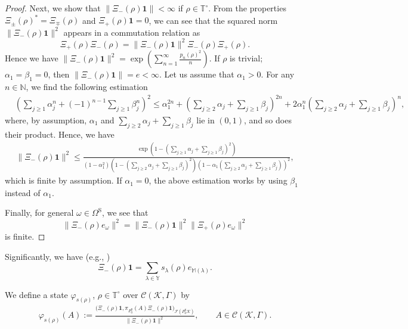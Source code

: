 \documentclass[pdftex]{sigma}
\numberwithin{equation}{section}
\newcommand{\mcal}[1]{\mathcal{#1}}
\newcommand{\mbb}[1]{\mathbb{#1}}
\newcommand{\mrm}[1]{\mathrm{#1}}
\begin{document}
\begin{proof}
Next, we show that $\|\Xi_{-}(\rho)\bm{1}\|<\infty$ if $\rho\in\mbb{T}^{\circ}$. From the properties $\Xi_{\pm}(\rho)^{\ast}=\Xi_{\mp}(\rho)$ and $\Xi_{+}(\rho)\bm{1}=0$, we can see that the squared norm $\|\Xi_{-}(\rho)\bm{1}\|^{2}$ appears in a commutation relation as
\begin{equation*}
	\Xi_{+}(\rho)\Xi_{-}(\rho)=\|\Xi_{-}(\rho)\bm{1}\|^{2}\Xi_{-}(\rho)\Xi_{+}(\rho).
\end{equation*}
Hence we have $\|\Xi_{-}(\rho)\bm{1}\|^{2}=\exp\left(\sum_{n=1}^{\infty}\frac{p_{n}(\rho)^{2}}{n}\right)$.
If $\rho$ is trivial; $\alpha_{1}=\beta_{1}=0$, then $\|\Xi_{-}(\rho)\bm{1}\|=e<\infty$.
Let us assume that $\alpha_{1}>0$. For any $n\in\mbb{N}$, we find the following estimation
\begin{align*}
	&\left(\sum_{j\ge 1}\alpha_{j}^{n}+(-1)^{n-1}\sum_{j\ge 1}\beta_{j}^{n}\right)^{2}
	\le \alpha_{1}^{2n}+\left(\sum_{j\ge 2}\alpha_{j}+\sum_{j\ge 1}\beta_{j}\right)^{2n}+2\alpha_{1}^{n}\left(\sum_{j\ge 2}\alpha_{j}+\sum_{j\ge 1}\beta_{j}\right)^{n},
\end{align*}
where, by assumption, $\alpha_{1}$ and $\sum_{j\ge 2}\alpha_{j}+\sum_{j\ge 1}\beta_{j}$ lie in $(0,1)$, and so does their product.
Hence, we have
\begin{align*}
	\|\Xi_{-}(\rho)\bm{1}\|^{2}\le \frac{\exp\left(1-\left(\sum_{j\ge 1}\alpha_{j}+\sum_{j\ge 1}\beta_{j}\right)^{2}\right)}{\left(1-\alpha_{1}^{2}\right)\left(1-\left(\sum_{j\ge 2}\alpha_{j}+\sum_{j\ge 1}\beta_{j}\right)^{2}\right)\left(1-\alpha_{1}\left(\sum_{j\ge 2}\alpha_{j}+\sum_{j\ge 1}\beta_{j}\right)\right)^{2}},
\end{align*}
which is finite by assumption. If $\alpha_{1}=0$, the above estimation works by using $\beta_{1}$ instead of $\alpha_{1}$.

Finally, for general $\omega\in \Omega^{\mrm{S}}$, we see that
\begin{equation*}
	\|\Xi_{-}(\rho)e_{\omega}\|^{2}=\|\Xi_{-}(\rho)\bm{1}\|^{2}\|\Xi_{+}(\rho)e_{\omega}\|^{2}
\end{equation*}
is finite.
\end{proof}

Significantly, we have (e.g., \cite[Appendix~A]{Okounkov2001})
\begin{equation}\label{eq:generating_Schur}
	\Xi_{-}(\rho)\bm{1}=\sum_{\lambda\in\mbb{Y}}s_{\lambda}(\rho)e_{\mbb{M}(\lambda)}.
\end{equation}

We define a state $\varphi_{s(\rho)}$, $\rho\in\mbb{T}^{\circ}$ over $\mcal{C}(\mcal{K},\Gamma)$ by
\begin{align*}
\varphi_{s(\rho)}(A):= \frac{\big(\Xi_{-}(\rho)\bm{1},\pi_{P^{\mrm{S}}_{0}}(A)\Xi_{-}(\rho)\bm{1}\big)_{\mcal{F}(P^{\mrm{S}}_{0} \mcal{K})}}{\|\Xi_{-}(\rho)\bm{1}\|^{2}},\qquad A\in \mcal{C}(\mcal{K},\Gamma).
\end{align*}
\end{document}

